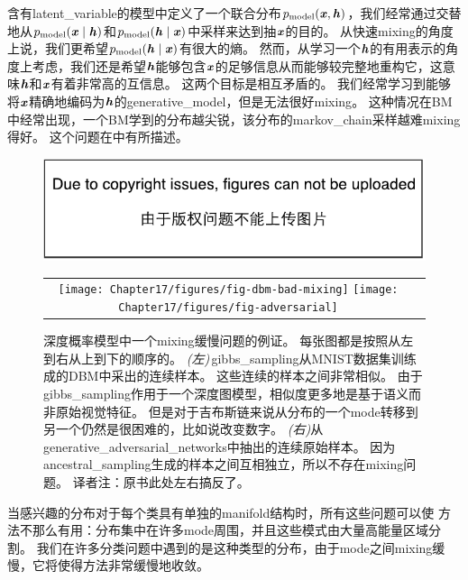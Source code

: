 含有\gls{latent_variable}的模型中定义了一个联合分布$p_{\text{model}}(\boldsymbol{\mathit{x}},\boldsymbol{\mathit{h}})$，我们经常通过交替地从$p_{\text{model}}(\boldsymbol{\mathit{x}}\mid \boldsymbol{\mathit{h}})$和$p_{\text{model}}(\boldsymbol{\mathit{h}}\mid \boldsymbol{\mathit{x}})$中采样来达到抽$\boldsymbol{\mathit{x}}$的目的。  %
从快速\gls{mixing}的角度上说，我们更希望$p_{\text{model}}(\boldsymbol{\mathit{h}}\mid \boldsymbol{\mathit{x}})$有很大的熵。
然而，从学习一个$\boldsymbol{\mathit{h}}$的有用表示的角度上考虑，我们还是希望$\boldsymbol{\mathit{h}}$能够包含$\boldsymbol{\mathit{x}}$的足够信息从而能够较完整地重构它，这意味$\boldsymbol{\mathit{h}}$和$\boldsymbol{\mathit{x}}$有着非常高的互信息。
这两个目标是相互矛盾的。
我们经常学习到能够将$\boldsymbol{\mathit{x}}$精确地编码为$\boldsymbol{\mathit{h}}$的\gls{generative_model}，但是无法很好\gls{mixing}。
这种情况在\gls{BM}中经常出现，一个\gls{BM}学到的分布越尖锐，该分布的\gls{markov_chain}采样越难\gls{mixing}得好。
这个问题在中有所描述。


\begin{figure}[!htb]
\ifOpenSource
\centerline{\includegraphics{figure.pdf}}
\else
    \centering
    \begin{tabular}{cc}
    \texttt{[image: Chapter17/figures/fig-dbm-bad-mixing]}
    \texttt{[image: Chapter17/figures/fig-adversarial]}    
    \end{tabular}
\fi
\caption{深度概率模型中一个\gls{mixing}缓慢问题的例证。
每张图都是按照从左到右从上到下的顺序的。
\emph{(左)}\,\gls{gibbs_sampling}从MNIST数据集训练成的\gls{DBM}中采出的连续样本。
这些连续的样本之间非常相似。
由于\,\gls{gibbs_sampling}作用于一个深度图模型，相似度更多地是基于语义而非原始视觉特征。
但是对于吉布斯链来说从分布的一个\gls{mode}转移到另一个仍然是很困难的，比如说改变数字。
\emph{(右)}从\gls{generative_adversarial_networks}中抽出的连续原始样本。
因为\gls{ancestral_sampling}生成的样本之间互相独立，所以不存在\gls{mixing}问题。
{译者注：原书此处左右搞反了。}} %
\label{fig:chap17_fig-dbm-bad-mixing}
\end{figure}


当感兴趣的分布对于每个类具有单独的\gls{manifold}结构时，所有这些问题可以使\,\,方法不那么有用：分布集中在许多\gls{mode}周围，并且这些模式由大量高能量区域分割。
我们在许多分类问题中遇到的是这种类型的分布，由于\gls{mode}之间\gls{mixing}缓慢，它将使得方法非常缓慢地收敛。



